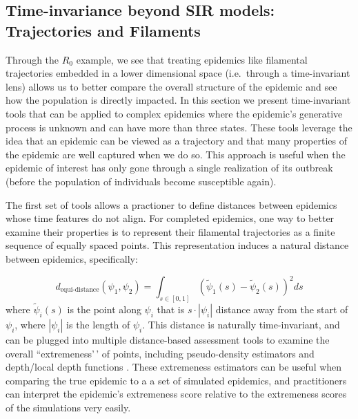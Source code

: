 \documentclass[
  shortnames]{jss}
\begin{document}
\hypertarget{time-invariance-beyond-sir-models-trajectories-and-filaments}{%
\subsection{Time-invariance beyond SIR models: Trajectories and
Filaments}\label{time-invariance-beyond-sir-models-trajectories-and-filaments}}

Through the \(R_0\) example, we see that treating epidemics like
filamental trajectories embedded in a lower dimensional space
(i.e.~through a time-invariant lens) allows us to better compare the
overall structure of the epidemic and see how the population is directly
impacted. In this section we present time-invariant tools that can be
applied to complex epidemics where the epidemic's generative process is
unknown and can have more than three states. These tools leverage the
idea that an epidemic can be viewed as a trajectory and that many
properties of the epidemic are well captured when we do so. This
approach is useful when the epidemic of interest has only gone through a
single realization of its outbreak (before the population of individuals
become susceptible again).

The first set of tools allows a practioner to define distances between
epidemics whose time features do not align. For completed epidemics, one
way to better examine their properties is to represent their filamental
trajectories as a finite sequence of equally spaced points. This
representation induces a natural distance between epidemics,
specifically:

\[
d_\text{equi-distance}(\psi_1, \psi_2)  = \int_{s \in [0,1]} (\tilde{\psi}_1(s) - \tilde{\psi}_2(s))^2 ds
\] where \(\tilde{\psi}_i(s)\) is the point along \(\psi_i\) that is
\(s\cdot|\psi_i|\) distance away from the start of \(\psi_i\), where
\(|\psi_i|\) is the length of \(\psi_i\). This distance is naturally
time-invariant, and can be plugged into multiple distance-based
assessment tools to examine the overall ``extremeness'\,' of points,
including pseudo-density estimators and depth/local depth functions
\citep[for examples see][]{Ciollaro2016, Geenens2017}. These extremeness
estimators can be useful when comparing the true epidemic to a a set of
simulated epidemics, and practitioners can interpret the epidemic's
extremeness score relative to the extremeness scores of the simulations
very easily.
\end{document}
